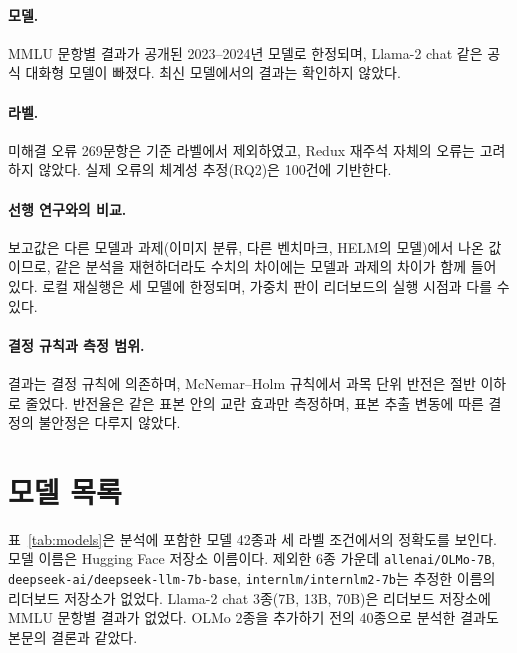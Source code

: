 \documentclass[11pt]{article}
\begin{document}
\paragraph{모델.}
MMLU 문항별 결과가 공개된 2023--2024년 모델로 한정되며, Llama-2 chat 같은 공식 대화형 모델이 빠졌다. 최신 모델에서의 결과는 확인하지 않았다.

\paragraph{라벨.}
미해결 오류 269문항은 기준 라벨에서 제외하였고, Redux 재주석 자체의 오류는 고려하지 않았다. 실제 오류의 체계성 추정(RQ2)은 100건에 기반한다.

\paragraph{선행 연구와의 비교.}
보고값은 다른 모델과 과제(이미지 분류, 다른 벤치마크, HELM의 모델)에서 나온 값이므로, 같은 분석을 재현하더라도 수치의 차이에는 모델과 과제의 차이가 함께 들어 있다. 로컬 재실행은 세 모델에 한정되며, 가중치 판이 리더보드의 실행 시점과 다를 수 있다.

\paragraph{결정 규칙과 측정 범위.}
결과는 결정 규칙에 의존하며, McNemar--Holm 규칙에서 과목 단위 반전은 절반 이하로 줄었다. 반전율은 같은 표본 안의 교란 효과만 측정하며, 표본 추출 변동에 따른 결정의 불안정은 다루지 않았다.



\appendix

\section{모델 목록}
\label{app:models}

표~\ref{tab:models}은 분석에 포함한 모델 42종과 세 라벨 조건에서의 정확도를 보인다. 모델 이름은 Hugging Face 저장소 이름이다. 제외한 6종 가운데 \texttt{allenai/OLMo-7B}, \texttt{deepseek-ai/deepseek-llm-7b-base}, \texttt{internlm/internlm2-7b}는 추정한 이름의 리더보드 저장소가 없었다. Llama-2 chat 3종(7B, 13B, 70B)은 리더보드 저장소에 MMLU 문항별 결과가 없었다. OLMo 2종을 추가하기 전의 40종으로 분석한 결과도 본문의 결론과 같았다.

\begin{table}[t]
\centering\small

\caption{모델별 정확도(\%). 공개 점수는 결합된 5,690문항의 원래 정답, $S$ 원래 정답과 $S$ 수정 정답은 분석 집합 5,421문항에서의 정확도이며, 변화는 수정 정답과 원래 정답의 차이이다. 수정 정답 기준 정확도 순으로 정렬하였다.}
\label{tab:models}
\end{table}
\end{document}
